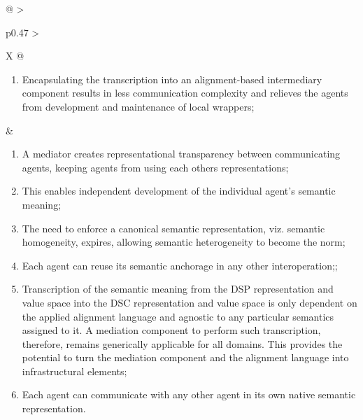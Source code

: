 \begin{xltabular}[l]{\linewidth}{@{} >{\small\raggedright\arraybackslash}p{0.47\linewidth} >{\small\raggedright\arraybackslash}X @{}}
\begin{enumerate}[left=6pt, nosep]
  \item Encapsulating the transcription into an alignment-based intermediary component results in less communication complexity and relieves the agents from development and maintenance of local wrappers;
\end{enumerate}
&
\begin{enumerate}[left=10pt, nosep]
  \item A mediator creates representational transparency between communicating agents, keeping agents from using each others representations;
  \item This enables independent development of the individual agent’s semantic meaning;
  \item The need to enforce a canonical semantic representation, viz. semantic homogeneity, expires, allowing semantic heterogeneity to become the norm;
  \item Each agent can reuse its semantic anchorage in any other interoperation;;
  \item Transcription of the semantic meaning from the DSP representation and value space into the DSC representation and value space is only dependent on the applied alignment language and agnostic to any particular semantics assigned to it. A mediation component to perform such transcription, therefore, remains generically applicable for all domains. This provides the potential to turn the mediation component and the alignment language into infrastructural elements;
  \item Each agent can communicate with any other agent in its own native semantic representation.
\end{enumerate}\\
%
\bottomrule
\end{xltabular}
